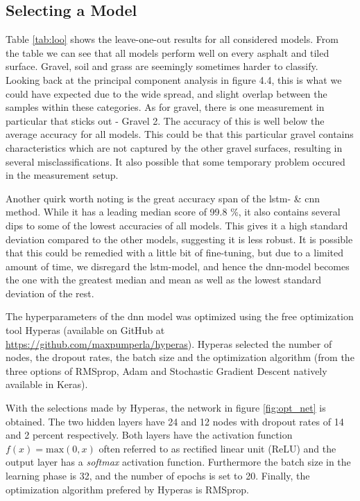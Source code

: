 \subsection{Selecting a Model}

Table \ref{tab:loo} shows the leave-one-out results for all considered models. From the table we can see that all models perform well on every asphalt and tiled surface. Gravel, soil and grass are seemingly sometimes harder to classify. Looking back at the principal component analysis in figure 4.4, this is what we could have expected due to the wide spread, and slight overlap between the samples within these categories. As for gravel, there is one measurement in particular that sticks out - Gravel 2. The accuracy of this is well below the average accuracy for all models. This could be that this particular gravel contains characteristics which are not captured by the other gravel surfaces, resulting in several misclassifications. It also possible that some temporary problem occured in the measurement setup.

Another quirk worth noting is the great accuracy span of the \gls{lstm}- \& \gls{cnn} method. While it has a leading median score of 99.8 \%, it also contains several dips to some of the lowest accuracies of all models. This gives it a high standard deviation compared to the other models, suggesting it is less robust. It is possible that this could be remedied with a little bit of fine-tuning, but due to a limited amount of time, we disregard the \gls{lstm}-model, and hence the  \gls{dnn}-model becomes the one with the greatest median and mean as well as the lowest standard deviation of the rest. 


% 

The hyperparameters of the \gls{dnn} model was optimized using the free optimization tool Hyperas (available on GitHub at \url{https://github.com/maxpumperla/hyperas}). Hyperas selected the number of nodes, the dropout rates, the batch size and the optimization algorithm (from the three options of RMSprop, Adam and Stochastic Gradient Descent natively available in Keras). 


With the selections made by Hyperas, the network in figure \ref{fig:opt_net} is obtained. The two hidden layers have 24 and 12 nodes with dropout rates of 14 and 2 percent respectively. Both layers have the activation function $f(x)=\textrm{max}(0,x)$ often referred to as rectified linear unit (ReLU) and the output layer has a \textit{softmax} activation function. Furthermore the batch size in the learning phase is 32, and the number of epochs is set to 20. Finally, the optimization algorithm prefered by Hyperas is RMSprop.

